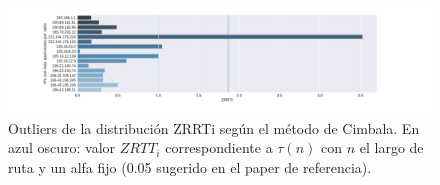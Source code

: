\begin{figure}[H]
   \centering
       \includegraphics[width=1\textwidth, height=1\textheight, keepaspectratio]{../img/mak-ac-ug-zrtt}
 \caption{Outliers de la distribución ZRRTi según el método de Cimbala. En azul oscuro: valor $ZRTT_i$ correspondiente a $\tau(n)$ con $n$ el largo de ruta y un alfa fijo (0.05 sugerido en el paper de referencia).}
 \label{fig:makerere-zrtt}
\end{figure}

